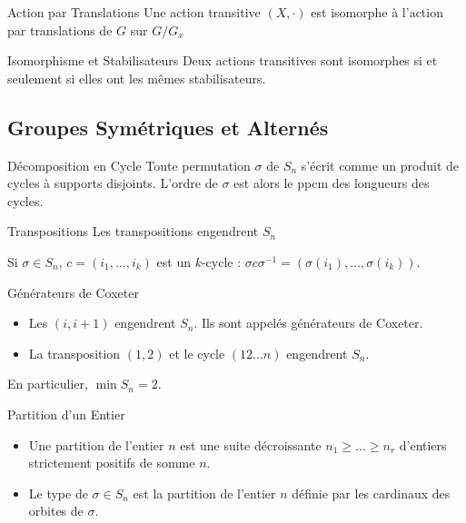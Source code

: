 \documentclass{cours}
\begin{document}
\begin{propositionfr}{Action par Translations}{}
    Une action transitive $\left(X, \cdot\right)$ est isomorphe à l'action par translations de $G$ sur $G/G_{x}$
\end{propositionfr}

\begin{propositionfr}{Isomorphisme et Stabilisateurs}{}
    Deux actions transitives sont isomorphes si et seulement si elles ont les mêmes stabilisateurs.
\end{propositionfr}

\subsection{Groupes Symétriques et Alternés}
\begin{propositionfr}{Décomposition en Cycle}{}
    Toute permutation $\sigma$ de $S_{n}$ s'écrit comme un produit de cycles à supports disjoints. L'ordre de $\sigma$ est alors le ppcm des longueurs des cycles.
\end{propositionfr}

\begin{propositionfr}{Transpositions}{}
    Les transpositions engendrent $S_{n}$
\end{propositionfr}

\begin{lemma}
    Si $\sigma \in S_{n}$, $c = \left(i_{1}, \ldots, i_{k}\right)$ est un $k$-cycle : $\sigma c\sigma^{-1} = \left(\sigma(i_{1}), \ldots, \sigma(i_{k})\right)$.
\end{lemma}

\begin{propositionfr}{Générateurs de Coxeter}{}
    \begin{itemize}
        \item Les $(i, i+1)$ engendrent $S_{n}$. Ils sont appelés générateurs de Coxeter.
        \item La transposition $(1, 2)$ et le cycle $(1 2\ldots n)$ engendrent $S_{n}$.
    \end{itemize}
    En particulier, $\min S_{n} = 2$.
\end{propositionfr}

\begin{définition}{Partition d'un Entier}{}
    \begin{itemize}
        \item Une partition de l'entier $n$ est une suite décroissante $n_{1} \geq \ldots \geq n_{r}$ d'entiers strictement positifs de somme $n$.
        \item Le type de $\sigma \in S_{n}$ est la partition de l'entier $n$ définie par les cardinaux des orbites de $\sigma$.
    \end{itemize}
\end{définition}
\end{document}
